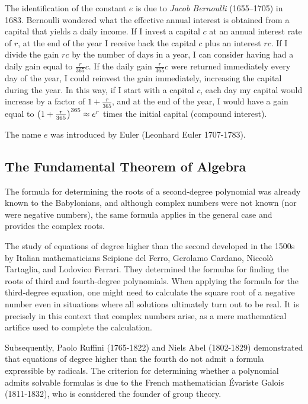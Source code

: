 \label{note:Bernoulli}%
%
The identification of the constant $e$
is due to \emph{Jacob Bernoulli} (1655--1705) in 1683.
Bernoulli wondered what the effective annual interest
is obtained from a capital that yields a daily income.
If I invest a capital $c$ at an annual interest rate 
of $r$, at the end of the year I receive back 
the capital $c$ plus an interest $rc$.
If I divide the gain $rc$ by the number of days in 
a year, I can consider having had a daily gain
equal to $\frac{r}{365} c$.
If the daily gain $\frac{r}{365} c$ were returned 
immediately every day of the year, I could reinvest the gain immediately, 
increasing the capital during the year.
In this way, if I start with a capital $c$, each day my capital 
would increase by a factor of $1+\frac{r}{365}$, and
at the end of the year, I would have a gain
equal to ${\left( 1+\frac{r}{365} \right)}^{365} \approx e^r$ 
times the initial capital (compound interest).

The name $e$ was introduced by Euler (Leonhard Euler 1707-1783).

\subsection{The Fundamental Theorem of Algebra}

The formula for determining the roots of a second-degree polynomial 
was already known to the Babylonians, and although complex numbers were not
known
(nor were negative numbers), the same formula applies 
in the general case and provides the complex roots.

The study of equations of degree higher than the second developed 
in the 1500s by Italian mathematicians Scipione del Ferro, 
Gerolamo Cardano, Niccolò Tartaglia, and Lodovico Ferrari.
They determined the formulas for finding the roots 
of third and fourth-degree polynomials. 
When applying the formula for the third-degree equation, 
one might need to calculate the square root of a negative number
even in situations where all solutions ultimately turn out to be real.
It is precisely in this context that complex numbers arise, as 
a mere mathematical artifice used to complete the calculation.

Subsequently, Paolo Ruffini (1765-1822) and Niels Abel (1802-1829) demonstrated
that equations
of degree higher than the fourth do not admit a formula 
expressible by radicals. 
The criterion for determining whether a polynomial
admits solvable formulas is due to the French mathematician Évariste Galois
(1811-1832), who is considered the founder of group theory.

